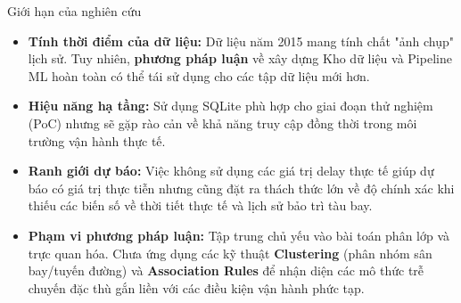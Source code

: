 \begin{frame}{Giới hạn của nghiên cứu}
  \begin{itemize}
    \item \textbf{Tính thời điểm của dữ liệu:} Dữ liệu năm 2015 mang tính chất "ảnh chụp" lịch sử. Tuy nhiên, \textbf{phương pháp luận} về xây dựng Kho dữ liệu và Pipeline ML hoàn toàn có thể tái sử dụng cho các tập dữ liệu mới hơn.
    \item \textbf{Hiệu năng hạ tầng:} Sử dụng SQLite phù hợp cho giai đoạn thử nghiệm (PoC) nhưng sẽ gặp rào cản về khả năng truy cập đồng thời trong môi trường vận hành thực tế.
    \item \textbf{Ranh giới dự báo:} Việc không sử dụng các giá trị delay thực tế giúp dự báo có giá trị thực tiễn nhưng cũng đặt ra thách thức lớn về độ chính xác khi thiếu các biến số về thời tiết thực tế và lịch sử bảo trì tàu bay.
    \item \textbf{Phạm vi phương pháp luận:} Tập trung chủ yếu vào bài toán phân lớp và trực quan hóa. Chưa ứng dụng các kỹ thuật \textbf{Clustering} (phân nhóm sân bay/tuyến đường) và \textbf{Association Rules} để nhận diện các mô thức trễ chuyến đặc thù gắn liền với các điều kiện vận hành phức tạp.
  \end{itemize}
\end{frame}

